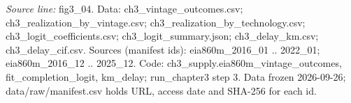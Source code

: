 {\scriptsize\textit{Source line:} fig3\_\allowbreak{}04. Data: ch3\_\allowbreak{}vintage\_\allowbreak{}outcomes.csv; ch3\_\allowbreak{}realization\_\allowbreak{}by\_\allowbreak{}vintage.csv; ch3\_\allowbreak{}realization\_\allowbreak{}by\_\allowbreak{}technology.csv; ch3\_\allowbreak{}logit\_\allowbreak{}coefficients.csv; ch3\_\allowbreak{}logit\_\allowbreak{}summary.json; ch3\_\allowbreak{}delay\_\allowbreak{}km.csv; ch3\_\allowbreak{}delay\_\allowbreak{}cif.csv. Sources (manifest ids): eia860m\_\allowbreak{}2016\_\allowbreak{}01 .. 2022\_\allowbreak{}01; eia860m\_\allowbreak{}2016\_\allowbreak{}12 .. 2025\_\allowbreak{}12. Code: ch3\_\allowbreak{}supply.eia860m\_\allowbreak{}vintage\_\allowbreak{}outcomes, fit\_\allowbreak{}completion\_\allowbreak{}logit, km\_\allowbreak{}delay; run\_\allowbreak{}chapter3 step 3. Data frozen 2026-09-26; data/raw/manifest.csv holds URL, access date and SHA-256 for each id.}